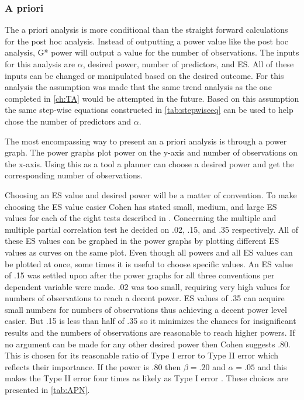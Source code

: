 \subsubsection{A priori}

The a priori analysis is more conditional than the straight forward calculations for the post hoc analysis.
Instead of outputting a power value like the post hoc analysis, G* power will output a value for the number of observations. 
The inputs for this analysis are $\alpha$, desired power, number of predictors, and ES.
All of these inputs can be changed or manipulated based on the desired outcome.
For this analysis the assumption was made that the same trend analysis as the one completed in \autoref{ch:TA} would be attempted in the future.
Based on this assumption the same step-wise equations constructed in \autoref{tab:stepwiseeq} can be used to help chose the number of predictors and $\alpha$.

The most encompassing way to present an a priori analysis is through a power graph.
The power graphs plot power on the y-axis and number of observations on the x-axis.
Using this as a tool a planner can choose a desired power and get the corresponding number of observations.

Choosing an ES value and desired power will be a matter of convention.
To make choosing the ES value easier Cohen has stated small, medium, and large ES values for each of the eight tests described in \citet{cohen1992power}.
Concerning the multiple and multiple partial correlation test he decided on .02, .15, and .35 respectively.
All of these ES values can be graphed in the power graphs by plotting different ES values as curves on the same plot.
Even though all powers and all ES values can be plotted at once, some times it is useful to choose specific values.
An ES value of .15 was settled upon after the power graphs for all three conventions per dependent variable were made.
.02 was too small, requiring very high values for numbers of observations to reach a decent power.
ES values of .35 can acquire small numbers for numbers of observations thus achieving a decent power level easier.
But .15 is less than half of .35 so it minimizes the chances for insignificant results and the numbers of observations are reasonable to reach higher powers.
If no argument can be made for any other desired power then Cohen suggests .80.
This is chosen for its reasonable ratio of Type I error to Type II error which reflects their importance.
If the power is .80 then $\beta=.20$ and $\alpha=.05$ and this makes the Type II error four times as likely as Type I error \citep{cohen1992statistical}.
These choices are presented in \autoref{tab:APN}.


